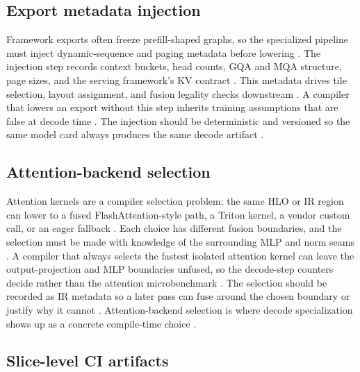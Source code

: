 \subsection{Export metadata injection}

Framework exports often freeze prefill-shaped graphs, so the specialized pipeline must inject dynamic-sequence and paging metadata before lowering \citep{patel2025llminference,kwon2023vllm,chen2020compilerbasedhardw}. The injection step records context buckets, head counts, GQA and MQA structure, page sizes, and the serving framework's KV contract \citep{kwon2023vllm,dao2022flashattention,yirage2026}. This metadata drives tile selection, layout assignment, and fusion legality checks downstream \citep{chen2020compilerbasedhardw,memoryfloor2026,taxbreak2026}. A compiler that lowers an export without this step inherits training assumptions that are false at decode time \citep{patel2025llminference,kwon2023vllm}. The injection should be deterministic and versioned so the same model card always produces the same decode artifact \citep{chen2020compilerbasedhardw,patel2025llminference}.

\subsection{Attention-backend selection}

Attention kernels are a compiler selection problem: the same HLO or IR region can lower to a fused FlashAttention-style path, a Triton kernel, a vendor custom call, or an eager fallback \citep{dao2022flashattention,dao2023flashdecoding,taxbreak2026}. Each choice has different fusion boundaries, and the selection must be made with knowledge of the surrounding MLP and norm seams \citep{memoryfloor2026,patel2025llminference}. A compiler that always selects the fastest isolated attention kernel can leave the output-projection and MLP boundaries unfused, so the decode-step counters decide rather than the attention microbenchmark \citep{taxbreak2026,memoryfloor2026}. The selection should be recorded as IR metadata so a later pass can fuse around the chosen boundary or justify why it cannot \citep{chen2020compilerbasedhardw,yirage2026}. Attention-backend selection is where decode specialization shows up as a concrete compile-time choice \citep{dao2022flashattention,patel2025llminference}.

\subsection{Slice-level CI artifacts}

